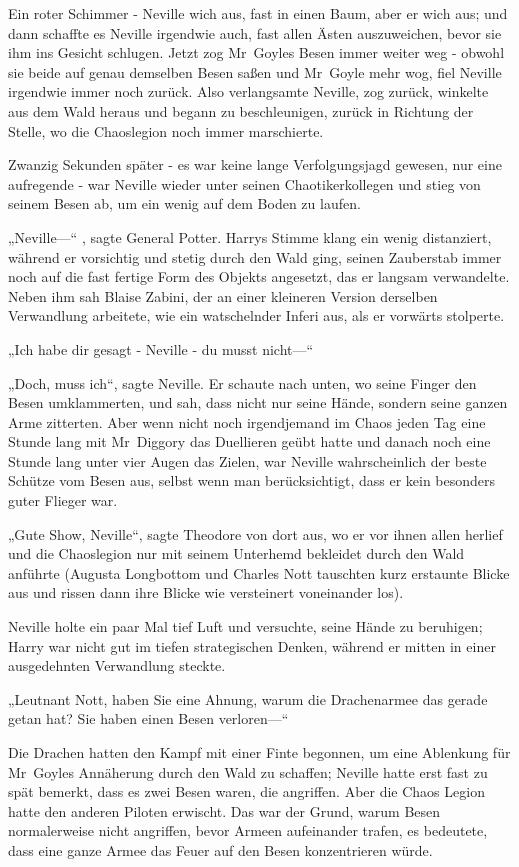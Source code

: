{Ein roter Schimmer - Neville wich aus, fast in einen Baum, aber er wich aus; und dann schaffte es Neville irgendwie auch, fast allen Ästen auszuweichen, bevor sie ihm ins Gesicht schlugen. Jetzt zog Mr~Goyles Besen immer weiter weg - obwohl sie beide auf genau demselben Besen saßen und Mr~Goyle mehr wog, fiel Neville irgendwie immer noch zurück. Also verlangsamte Neville, zog zurück, winkelte aus dem Wald heraus und begann zu beschleunigen, zurück in Richtung der Stelle, wo die Chaoslegion noch immer marschierte.

Zwanzig Sekunden später - es war keine lange Verfolgungsjagd gewesen, nur eine aufregende - war Neville wieder unter seinen Chaotikerkollegen und stieg von seinem Besen ab, um ein wenig auf dem Boden zu laufen.

„Neville—“ , sagte General Potter. Harrys Stimme klang ein wenig distanziert, während er vorsichtig und stetig durch den Wald ging, seinen Zauberstab immer noch auf die fast fertige Form des Objekts angesetzt, das er langsam verwandelte. Neben ihm sah Blaise Zabini, der an einer kleineren Version derselben Verwandlung arbeitete, wie ein watschelnder Inferi aus, als er vorwärts stolperte.

„Ich habe dir gesagt - Neville - du musst nicht—“

„Doch, muss ich“, sagte Neville. Er schaute nach unten, wo seine Finger den Besen umklammerten, und sah, dass nicht nur seine Hände, sondern seine ganzen Arme zitterten. Aber wenn nicht noch irgendjemand im Chaos jeden Tag eine Stunde lang mit Mr~Diggory das Duellieren geübt hatte und danach noch eine Stunde lang unter vier Augen das Zielen, war Neville wahrscheinlich der beste Schütze vom Besen aus, selbst wenn man berücksichtigt, dass er kein besonders guter Flieger war.

„Gute Show, Neville“, sagte Theodore von dort aus, wo er vor ihnen allen herlief und die Chaoslegion nur mit seinem Unterhemd bekleidet durch den Wald anführte (Augusta Longbottom und Charles Nott tauschten kurz erstaunte Blicke aus und rissen dann ihre Blicke wie versteinert voneinander los).

Neville holte ein paar Mal tief Luft und versuchte, seine Hände zu beruhigen; Harry war nicht gut im tiefen strategischen Denken, während er mitten in einer ausgedehnten Verwandlung steckte.

„Leutnant Nott, haben Sie eine Ahnung, warum die Drachenarmee das gerade getan hat? Sie haben einen Besen verloren—“

Die Drachen hatten den Kampf mit einer Finte begonnen, um eine Ablenkung für Mr~Goyles Annäherung durch den Wald zu schaffen; Neville hatte erst fast zu spät bemerkt, dass es zwei Besen waren, die angriffen. Aber die Chaos Legion hatte den anderen Piloten erwischt. Das war der Grund, warum Besen normalerweise nicht angriffen, bevor Armeen aufeinander trafen, es bedeutete, dass eine ganze Armee das Feuer auf den Besen konzentrieren würde.

}
